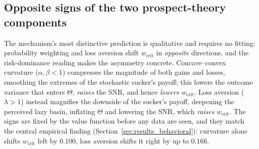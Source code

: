 \documentclass[letterpaper]{article}
\theoremstyle{plain}
\newcommand{\wcrit}{w_{\mathrm{crit}}}
\begin{document}
\subsection{Opposite signs of the two prospect-theory components}
The mechanism's most distinctive prediction is qualitative and requires no
fitting: probability weighting and loss aversion shift $\wcrit$ in
\emph{opposite} directions, and the risk-dominance reading makes the asymmetry
concrete. Concave--convex curvature ($\alpha,\beta<1$) compresses the magnitude
of both gains and losses, smoothing the extremes of the stochastic sucker's
payoff; this lowers the outcome variance that enters $\Theta$, \emph{raises} the
SNR, and hence \emph{lowers} $\wcrit$. Loss aversion ($\lambda>1$) instead
magnifies the downside of the sucker's payoff, deepening the perceived lazy
basin, inflating $\Theta$ and lowering the SNR, which \emph{raises} $\wcrit$. The signs are fixed by the value function before any data are
seen, and they match the central empirical finding
(Section~\ref{sec:results_behavioral}): curvature alone shifts $\wcrit$ left by
$0.100$, loss aversion shifts it right by up to $0.166$.
\end{document}
